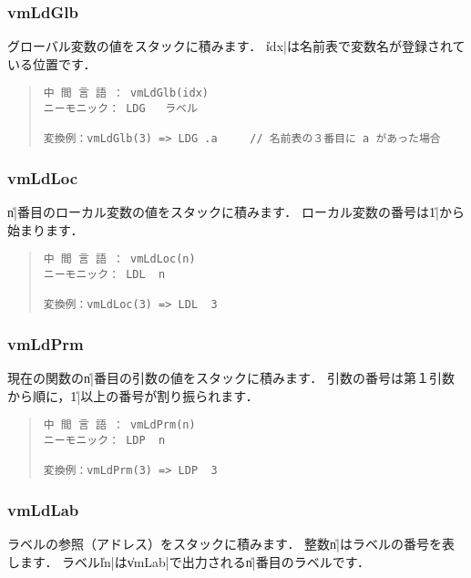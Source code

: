 \subsubsection{vmLdGlb}

グローバル変数の値をスタックに積みます．
\|idx|は名前表で変数名が登録されている位置です．

\begin{quote}
\begin{verbatim}
中 間 言 語 ： vmLdGlb(idx)
ニーモニック： LDG   ラベル

変換例：vmLdGlb(3) => LDG .a     // 名前表の３番目に a があった場合
\end{verbatim}
\end{quote}

\subsubsection{vmLdLoc}

\|n|番目のローカル変数の値をスタックに積みます．
ローカル変数の番号は\|1|から始まります．

\begin{quote}
\begin{verbatim}
中 間 言 語 ： vmLdLoc(n)
ニーモニック： LDL  n   

変換例：vmLdLoc(3) => LDL  3
\end{verbatim}
\end{quote}

\subsubsection{vmLdPrm}

現在の関数の\|n|番目の引数の値をスタックに積みます．
引数の番号は第１引数から順に，\|1|以上の番号が割り振られます．

\begin{quote}
\begin{verbatim}
中 間 言 語 ： vmLdPrm(n)
ニーモニック： LDP  n   

変換例：vmLdPrm(3) => LDP  3
\end{verbatim}
\end{quote}

\subsubsection{vmLdLab}

ラベルの参照（アドレス）をスタックに積みます．
整数\|n|はラベルの番号を表します．
ラベル\|ln|は\|vmLab|で出力される\|n|番目のラベルです．

